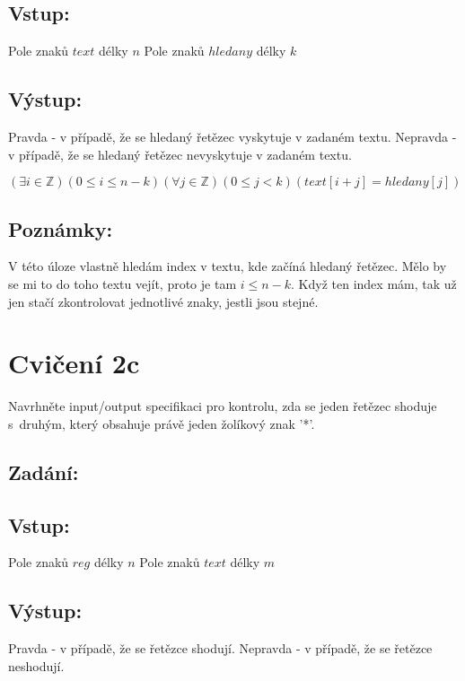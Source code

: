 \documentclass{article}
\newcommand{\Z}{\mathbb{Z}}
\begin{document}
\subsection{Vstup:}
Pole znaků $text$ délky $n$ \newline Pole znaků $hledany$ délky $k$

\subsection{Výstup:}
Pravda - v případě, že se hledaný řetězec vyskytuje v zadaném textu. \newline
Nepravda - v případě, že se hledaný řetězec nevyskytuje v zadaném textu.

$$(\exists i \in \Z)(0 \leq i \leq n - k)(\forall j \in \Z)(0 \leq j < k)(text[i+j] = hledany[j])$$

\subsection{Poznámky:}

V této úloze vlastně hledám index v textu, kde začíná hledaný řetězec. Mělo by se mi to do toho textu vejít, proto je tam $i \leq n - k$. Když ten index mám, tak už jen stačí zkontrolovat jednotlivé znaky, jestli jsou stejné.


\section{Cvičení 2c}

Navrhněte input/output specifikaci pro kontrolu, zda se jeden řetězec shoduje s~druhým, který obsahuje právě jeden žolíkový znak '*'.

\subsection{Zadání:}

\subsection{Vstup:}
Pole znaků $reg$ délky $n$ \newline
Pole znaků $text$ délky $m$

\subsection{Výstup:}

Pravda - v případě, že se řetězce shodují. \newline
Nepravda - v případě, že se řetězce neshodují.
\end{document}
